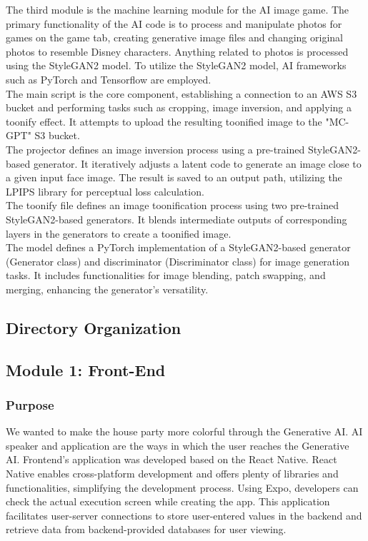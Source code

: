 \documentclass[conference]{IEEEtran}
\begin{document}
            The third module is the machine learning module for the AI image game. The primary functionality of the AI code is to process and manipulate photos for games on the game tab, creating generative image files and changing original photos to resemble Disney characters. Anything related to photos is processed using the StyleGAN2 model. To utilize the StyleGAN2 model, AI frameworks such as PyTorch and Tensorflow are employed.\\
            The main script is the core component, establishing a connection to an AWS S3 bucket and performing tasks such as cropping, image inversion, and applying a toonify effect. It attempts to upload the resulting toonified image to the "MC-GPT" S3 bucket.\\
            The projector defines an image inversion process using a pre-trained StyleGAN2-based generator. It iteratively adjusts a latent code to generate an image close to a given input face image. The result is saved to an output path, utilizing the LPIPS library for perceptual loss calculation.\\
            The toonify file defines an image toonification process using two pre-trained StyleGAN2-based generators. It blends intermediate outputs of corresponding layers in the generators to create a toonified image.\\
            The model defines a PyTorch implementation of a StyleGAN2-based generator (Generator class) and discriminator (Discriminator class) for image generation tasks. It includes functionalities for image blending, patch swapping, and merging, enhancing the generator's versatility.\\

            
    \subsection{Directory Organization}
    \subsection{Module 1: Front-End}
        \subsubsection{Purpose}
            We wanted to make the house party more colorful through the Generative AI. AI speaker and application are the ways in which the user reaches the Generative AI. Frontend's application was developed based on the React Native. React Native enables cross-platform development and offers plenty of libraries and functionalities, simplifying the development process. Using Expo, developers can check the actual execution screen while creating the app. This application facilitates user-server connections to store user-entered values in the backend and retrieve data from backend-provided databases for user viewing.\\
            \vspace{3mm}
\end{document}
